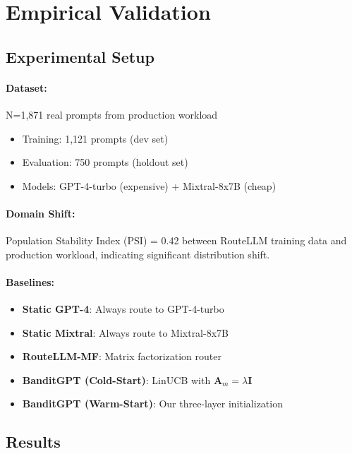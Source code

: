 \documentclass[sigconf]{acmart}
\begin{document}
\section{Empirical Validation}

\subsection{Experimental Setup}

\paragraph{Dataset:} N=1,871 real prompts from production workload
\begin{itemize}
    \item Training: 1,121 prompts (dev set)
    \item Evaluation: 750 prompts (holdout set)
    \item Models: GPT-4-turbo (expensive) + Mixtral-8x7B (cheap)
\end{itemize}

\paragraph{Domain Shift:} Population Stability Index (PSI) = 0.42 between RouteLLM training data and production workload, indicating significant distribution shift.

\paragraph{Baselines:}
\begin{itemize}
    \item \textbf{Static GPT-4}: Always route to GPT-4-turbo
    \item \textbf{Static Mixtral}: Always route to Mixtral-8x7B
    \item \textbf{RouteLLM-MF}: Matrix factorization router~\cite{ong2024routellm}
    \item \textbf{BanditGPT (Cold-Start)}: LinUCB with $\mathbf{A}_m = \lambda \mathbf{I}$
    \item \textbf{BanditGPT (Warm-Start)}: Our three-layer initialization
\end{itemize}

\subsection{Results}
\end{document}

